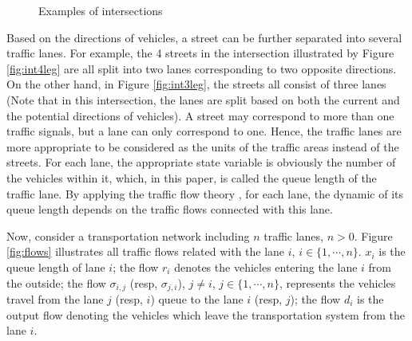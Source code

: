 \documentclass[preprint,authoryear,12pt]{elsarticle}
\begin{document}
\begin{figure}[ht]
  \centering
  \quad
  \caption{Examples of intersections}
\end{figure}

Based on the directions of vehicles, a street can be further
separated into several traffic lanes. For example, the 4 streets in
the intersection illustrated by Figure \ref{fig:int4leg} are all
split into two lanes corresponding to two opposite directions. On the
other hand, in Figure \ref{fig:int3leg}, the streets all consist of
three lanes (Note that in this intersection, the lanes are split
based on both the current and the potential directions of vehicles).
A street may correspond to more than one traffic signals, but a lane
can only correspond to one. Hence, the traffic lanes are more
appropriate to be considered as the units of the traffic areas
instead of the streets. For each lane, the appropriate state variable
is obviously the number of the vehicles within it, which, in this
paper, is called the queue length of the traffic lane. By applying
the traffic flow theory \citep{nathan_h_gartner_revised_2005}, for
each lane, the dynamic of its queue length depends on the traffic
flows connected with this lane.

Now, consider a transportation network including $n$ traffic lanes,
$n>0$. Figure \ref{fig:flows} illustrates all traffic flows related
with the lane $i$, $i\in\{1,\cdots,n\}$. $x_i$ is the queue length of
lane $i$; the flow $r_i$ denotes the vehicles entering the lane $i$
from the outside; the flow $\sigma_{i,j}$ (resp, $\sigma_{j,i}$),
$j\neq i$, $j\in\{1,\cdots,n\}$, represents the vehicles travel from
the lane $j$ (resp, $i$) queue to the lane $i$ (resp, $j$); the flow
$d_{i}$ is the output flow denoting the vehicles which leave the
transportation system from the lane $i$.
\end{document}
